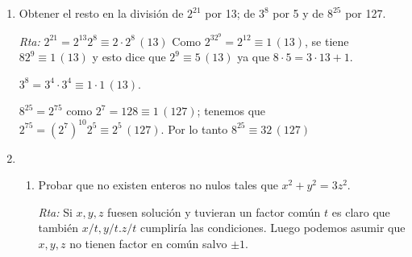 \documentclass[12pt,spanish,makeidx]{amsbook}
\newcommand{\rta}{\noindent\textit{Rta: }}
\newcommand{\md}[1]{{\,}\left(#1\right)}
\begin{document}
\begin{enumerate}
\begin{enumerate}
	\item $a = 4^{1000}; b = 7$;  \rta  $4^{1000}=(4^6)^{166}4^4\equiv (4^2)^2\equiv 2^2 \md{12}$.
	
	\item $a = 123^{456}; b = 31$;  \rta  $123^{456}\equiv (-1)^{456}\equiv 1 \md{31}.$
	
	\item $a = 7^{83}; b = 10$.  \rta  $7^{83}= (7^4)^{20}7^3\equiv 1^{20}343\equiv 3 \md{10}$.
\end{enumerate}
	
	\item Obtener el resto en la división de $2^{21}$ por 13; de $3^8$ por 5 y de
	$8^{25}$ por 127.
		
	\rta  $2^{21}=2^{13}2^8\equiv 2\cdot2^8 \md{13}$ Como $2^32^9= 2^{12}\equiv 1 \md{13}$, se tiene $82^9\equiv1 \md{13}$ y esto dice que $2^9\equiv 5 \md{13}$ ya que $8\cdot 5=3\cdot 13 +1$.
	
	$3^8=3^4\cdot 3^4\equiv 1\cdot1 \md{13}$.
	
	$8^{25}=2^{75}$ como $2^7=128\equiv1 \md{127}$; tenemos que $2^{75}=(2^7)^{10}2^5\equiv2^5 \md{127}$.
	Por lo tanto $8^{25}\equiv32 \md{127}$
	
	
	
	
	
	
	
	
	
	
	\smallskip
	\item \begin{enumerate}
		\item Probar que no existen enteros no nulos tales que $x^2 + y^2 = 3z^2$.
			
		\rta Si $x, y, z$ fuesen solución y tuvieran un factor común $t$ es claro que también $x/t, y/t. z/t$ cumpliría las condiciones. Luego podemos asumir que $x, y, z$ no tienen factor en común salvo $\pm1$.
		

\end{enumerate}
\end{enumerate}
\end{document}
